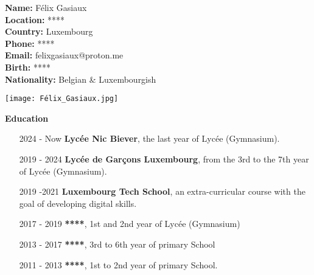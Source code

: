 \documentclass{article}
\begin{document}
\begin{minipage}[t]{0.4\textwidth}
    \begin{flushleft}
        \textbf{Name:} Félix Gasiaux \\
        \textbf{Location:} **** \\
        \textbf{Country:} Luxembourg\\
        \textbf{Phone:} **** \\
        \textbf{Email:} felixgasiaux@proton.me\\
        \textbf {Birth:} **** \\
        \textbf{Nationality:} Belgian \& Luxembourgish\\

    \end{flushleft}
\end{minipage}%
\begin{minipage}{0.55\textwidth}
    \begin{flushright}
        \texttt{[image: Félix\_Gasiaux.jpg]}
    \end{flushright}
\end{minipage}





\vspace{0.5cm} %
\centering %
\dotfill \textbf{\Large Education} \dotfill
\vspace{0.5cm} %

\begin{minipage}[t]{0.7\textwidth}
    \begin{itemize}
         \item [2024 - Now] \textbf{Lycée Nic Biever},  the last year of Lycée (Gymnasium).
        \item [2019 - 2024] \textbf{Lycée de Garçons Luxembourg}, from the 3rd to the 7th year of Lycée (Gymnasium).
    	\item [2019 -2021 ] \textbf{Luxembourg Tech School}, an extra-curricular course with the goal of developing digital skills.
        \item [2017 - 2019] \textbf{****}, 1st and 2nd year of Lycée (Gymnasium)
        \item [2013 - 2017] \textbf{****}, 3rd to 6th year of primary School
        \item [2011 - 2013] \textbf{****}, 1st to 2nd year of primary School.

        \end{itemize}
\end{minipage}%
\end{document}
